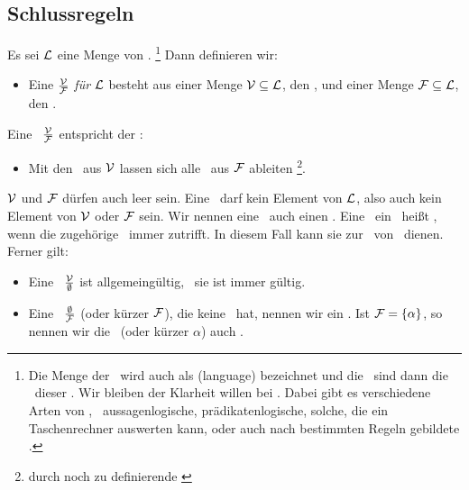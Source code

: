 \subsection{Schlussregeln}%
\label{sub:Schlussregeln}

Es sei $\mathcal{L}$ eine Menge von \Formeln.%
	\footnote{%
	Die Menge der \Formeln\ wird auch als  (language) bezeichnet und die \Formeln\ sind dann die \Worte\ dieser \Sprache.
	Wir bleiben der Klarheit willen bei \Formel.
	Dabei gibt es verschiedene Arten von \Formeln, \textzB\ aussagenlogische, prädikatenlogische, solche, die ein Taschenrechner auswerten kann, oder auch nach bestimmten Regeln gebildete \Zeichenketten.
}
Dann definieren wir:
\begin{itemize}
	\item[] Eine  $\frac{\mathcal{V}}{\mathcal{F}}$ \emph{für} $\mathcal{L}$ besteht aus einer Menge $\mathcal{V}\subseteq\mathcal{L}$, den , und einer Menge $\mathcal{F}\subseteq\mathcal{L}$, den .
\end{itemize}
Eine \Schlussregel\ $\frac{\mathcal{V}}{\mathcal{F}}$ entspricht der \Aussage:
%
\begin{itemize}
	\item[] Mit den \Voraussetzungen\ aus $\mathcal{V}$ lassen sich alle \Folgerungen\ aus $\mathcal{F}$ ableiten%
	\footnote{durch noch zu definierende \emph{\zulaessigeTransformationen}}.
\end{itemize}
%
$\mathcal{V}$ und $\mathcal{F}$ dürfen auch leer sein.
Eine \Schlussregel\ darf kein Element von $\mathcal{L}$, also auch kein Element von $\mathcal{V}$ oder $\mathcal{F}$ sein.
Wir nennen eine \Schlussregel\ auch einen .
Eine  \textbzw\ ein \formalerSatz\ heißt , wenn die zugehörige \Aussage\ immer zutrifft.
In diesem Fall kann sie zur \zulaessigenTransformation\ von \Formeln\ dienen.
Ferner gilt:
%
\begin{itemize}
	\item Eine \Schlussregel\ $\frac{\mathcal{V}}{\emptyset}$ ist allgemeingültig, \textdh\ sie ist immer gültig.
	\item Eine \Schlussregel\ $\frac{\emptyset}{\mathcal{F}}$ (oder kürzer $\mathcal{F}$), die keine \Voraussetzungen\ hat, nennen wir ein .
	Ist $\mathcal{F} = \{\alpha\}$, so nennen wir die \Schlussregel\ (oder kürzer $\alpha$) auch .
\end{itemize}


